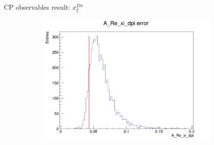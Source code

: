 \documentclass{beamer}
\begin{document}
\begin{frame}{CP observables result: $x_\xi^{D\pi}$}
\begin{figure}
\begin{subfigure}{0.42\textwidth}
      \includegraphics[width = 1.0\textwidth]{Plots/A_Re_xi_dpi_error_WithDataUncertainty.png}
    \end{subfigure}
  \end{figure}
\end{frame}
\end{document}
